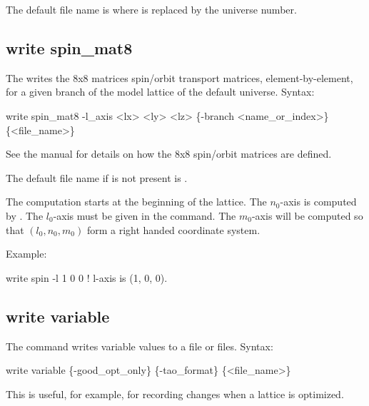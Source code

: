 {{{{{{{{{{{{The default file name is  where \vn{\#} is replaced by the universe number. 


\subsection{write spin_mat8}
\label{s:write.spin.mat8}

The  writes the 8x8 matrices spin/orbit transport matrices, element-by-element, for
a given branch of the model lattice of the default universe.
Syntax:
\begin{example}
  write spin_mat8 -l_axis <lx> <ly> <lz> \{-branch <name_or_index>\} \{<file_name>\}
\end{example}
See the \bmad manual for details on how the 8x8 spin/orbit matrices are defined. 

The default file name if  is not present is .

The computation starts at the beginning of the lattice. The $n_0$-axis is computed by \bmad. The
$l_0$-axis must be given in the  command.  The $m_0$-axis will be computed so
that $(l_0, n_0, m_0)$ form a right handed coordinate system.

Example:
\begin{example}
  write spin -l 1 0 0    ! l-axis is (1, 0, 0).
\end{example}


\subsection{write variable}
\label{s:write.variable}

The  command writes \tao variable values to a file or files.
Syntax:
\begin{example}
  write variable \{-good_opt_only\} \{-tao_format\} \{<file_name>\} 
\end{example}
This is useful, for example, for recording changes when a lattice is optimized.

}}}}}}}}}}}}
